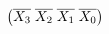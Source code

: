 \documentclass[preview]{standalone}
\begin{document}
\begin{align*}
\left(\overline{X_3}\hspace{0.1cm}\overline{X_2}\hspace{0.1cm}\overline{X_1}\hspace{0.1cm}\overline{X_0}\right)
\end{align*}
\end{document}
